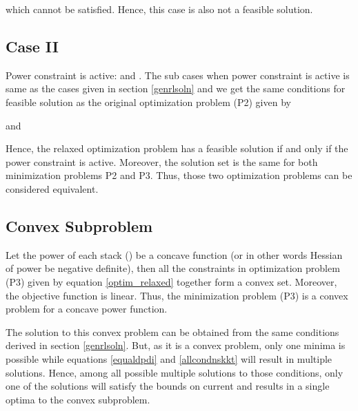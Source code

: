 \documentclass[twocolumn]{autart}
\begin{document}
which cannot be satisfied. Hence, this case is also not a feasible solution.
\subsection*{Case II}
Power constraint is active:  and . 
The sub cases when power constraint is active is same as the cases given in section \ref{genrlsoln} and we get the same conditions for feasible solution as the original optimization problem (P2) given by 

and 

Hence, the relaxed optimization problem has a feasible solution if and only if the power constraint is active. Moreover, the solution set is the same for both minimization problems P2 and P3. Thus, those two optimization problems can be considered equivalent.

\subsection{Convex Subproblem}
Let the power of each stack () be a concave function (or in other words Hessian of power be negative definite), then all the constraints in optimization problem (P3) given by equation \eqref{optim_relaxed} together form a convex set. Moreover, the objective function is linear. Thus, the minimization problem (P3) is a convex problem for a concave power function.

The solution to this convex problem can be obtained from the same conditions derived in section \ref{genrlsoln}. But, as it is a convex problem, only one minima is possible while equations \ref{equaldpdi} and \ref{allcondnskkt} will result in multiple solutions. Hence, among all possible multiple solutions to those conditions, only one of the solutions will satisfy the bounds on current and results in a single optima to the convex subproblem. 
\end{document}
